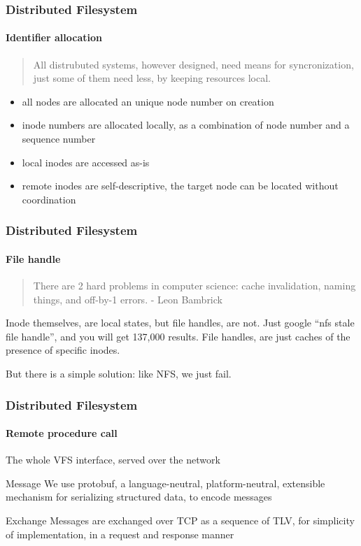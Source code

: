 \documentclass{ctexbeamer}
\begin{document}
\begin{frame}
\frametitle{Distributed Filesystem}
\framesubtitle{Identifier allocation}
\begin{verse}
  All distrubuted systems, however designed, need means for syncronization, just some of them need less, by keeping resources local.
\end{verse}
\begin{itemize}
  \item all nodes are allocated an unique node number on creation
  \item inode numbers are allocated locally, as a combination of node number and a sequence number
  \item local inodes are accessed as-is
  \item remote inodes are self-descriptive, the target node can be located without coordination
\end{itemize}
\end{frame}

\begin{frame}
\frametitle{Distributed Filesystem}
\framesubtitle{File handle}
\begin{quotation}
  There are 2 hard problems in computer science: cache invalidation, naming things, and off-by-1 errors.
  \flushright - Leon Bambrick
\end{quotation}
Inode themselves, are local states, but file handles, are not. Just google ``nfs stale file handle'', and you will get 137,000 results. File handles, are just caches of the presence of specific inodes.

But there is a simple solution: like NFS, we just fail.
\end{frame}

\begin{frame}
\frametitle{Distributed Filesystem}
\framesubtitle{Remote procedure call}
The whole VFS interface, served over the network
\begin{block}{Message}
  We use protobuf, a language-neutral, platform-neutral, extensible mechanism for serializing structured data, to encode messages
\end{block}
\begin{block}{Exchange}
  Messages are exchanged over TCP as a sequence of TLV, for simplicity of implementation, in a request and response manner
\end{block}
\end{frame}
\end{document}
